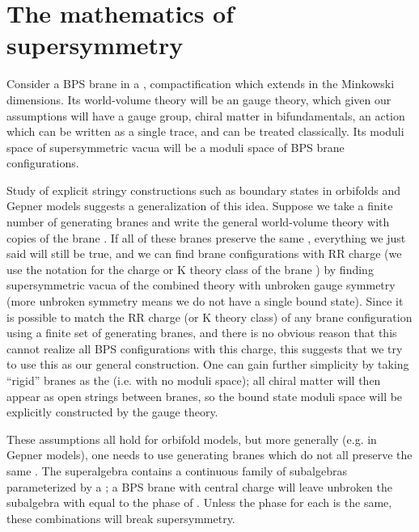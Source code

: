 \documentclass[a4paper,12pt]{amsart}
\numberwithin{equation}{section}
\theoremstyle{plain}
\theoremstyle{definition}
\def\grade{\varphi}
\def\cal{\mathcal}
\def\CN{{\cal N}}
\begin{document}
\section{The mathematics of \myHighlight{$\CN=1$}\coordHE{} supersymmetry}

Consider a BPS brane in a \coordHE{}, \myHighlight{$\CN=2$}\coordHE{} compactification which
extends in the Minkowski dimensions.  Its world-volume theory will be
an \myHighlight{$\CN=1$}\coordHE{} gauge theory, which given our assumptions will have a
\coordHE{} gauge group, chiral matter in bifundamentals, an action
which can be written as a single trace, and can be treated
classically.  Its moduli space of supersymmetric vacua will be a
moduli space of BPS brane configurations.

Study of explicit stringy constructions such as boundary states in
orbifolds and Gepner models suggests a generalization of this
idea.  Suppose we take a finite number of generating branes \coordHE{} and
write the general world-volume theory with \coordHE{} copies of the brane
\coordHE{}.  If all of these branes preserve the same \myHighlight{$\CN=1$}\coordHE{}, everything
we just said will still be true, and we can find brane configurations
with RR charge \coordHE{} (we use the notation \myHighlight{$[B]$}\coordHE{} for the
charge or K theory class of the brane \coordHE{}) by finding supersymmetric
vacua of the combined theory with unbroken \coordHE{} gauge symmetry (more
unbroken symmetry means we do not have a single bound state).  Since
it is possible to match the RR charge (or K theory class) of any brane
configuration using a finite set of generating branes, and there is no
obvious reason that this cannot realize all BPS configurations with
this charge, this suggests that we try to use this as our general
construction.  One can gain further simplicity by taking ``rigid''
branes as the \coordHE{} (i.e. with no moduli space); all chiral matter
will then appear as open strings between branes, so the bound state
moduli space will be explicitly constructed by the gauge theory.

These assumptions all hold for orbifold models, but more generally
(e.g. in Gepner models), one needs to use generating branes which do
not all preserve the same \myHighlight{$\CN=1$}\coordHE{}.  The \myHighlight{$\CN=2$}\coordHE{} superalgebra contains
a continuous family of \myHighlight{$\CN=1$}\coordHE{} subalgebras parameterized by a \coordHE{};
a BPS brane with central charge \coordHE{} will leave unbroken the \myHighlight{$\CN=1$}\coordHE{}
subalgebra \myHighlight{$Q = e^{i\pi\grade}\bar Q$}\coordHE{} with \myHighlight{$\pi\grade$}\coordHE{} equal to the phase
of \coordHE{}.  Unless the phase for each \coordHE{} is the same, these
combinations will break supersymmetry.
\end{document}
